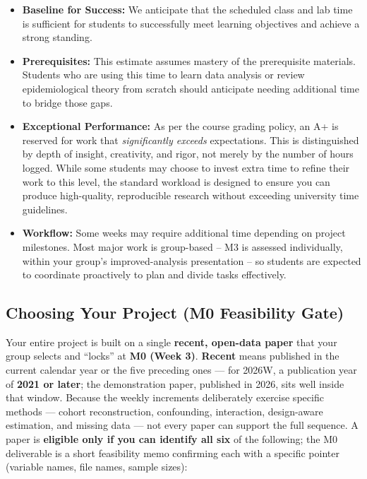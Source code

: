 \documentclass[
]{article}
\providecommand{\tightlist}{%
  \setlength{\itemsep}{0pt}\setlength{\parskip}{0pt}}
\begin{document}
\begin{itemize}
\tightlist
\item
  \textbf{Baseline for Success:} We anticipate that the scheduled class
  and lab time is sufficient for students to successfully meet learning
  objectives and achieve a strong standing.
\item
  \textbf{Prerequisites:} This estimate assumes mastery of the
  prerequisite materials. Students who are using this time to learn data
  analysis or review epidemiological theory from scratch should
  anticipate needing additional time to bridge those gaps.
\item
  \textbf{Exceptional Performance:} As per the course grading policy, an
  A+ is reserved for work that \emph{significantly exceeds}
  expectations. This is distinguished by depth of insight, creativity,
  and rigor, not merely by the number of hours logged. While some
  students may choose to invest extra time to refine their work to this
  level, the standard workload is designed to ensure you can produce
  high-quality, reproducible research without exceeding university time
  guidelines.
\item
  \textbf{Workflow:} Some weeks may require additional time depending on
  project milestones. Most major work is group-based -- M3 is assessed
  individually, within your group's improved-analysis presentation -- so
  students are expected to coordinate proactively to plan and divide
  tasks effectively.
\end{itemize}

\subsection{Choosing Your Project (M0 Feasibility
Gate)}\label{choosing-your-project-m0-feasibility-gate}

Your entire project is built on a single \textbf{recent, open-data
paper} that your group selects and ``locks'' at \textbf{M0 (Week 3)}.
\textbf{Recent} means published in the current calendar year or the five
preceding ones --- for 2026W, a publication year of \textbf{2021 or
later}; the demonstration paper, published in 2026, sits well inside
that window. Because the weekly increments deliberately exercise
specific methods --- cohort reconstruction, confounding, interaction,
design-aware estimation, and missing data --- not every paper can
support the full sequence. A paper is \textbf{eligible only if you can
identify all six} of the following; the M0 deliverable is a short
feasibility memo confirming each with a specific pointer (variable
names, file names, sample sizes):
\end{document}

